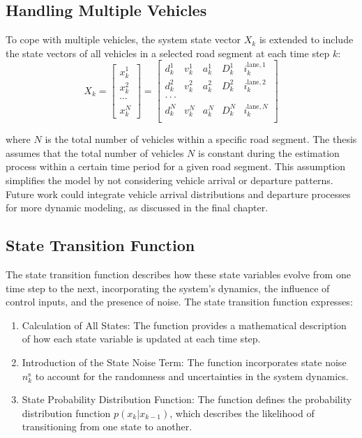 \subsection{Handling Multiple Vehicles}
To cope with multiple vehicles, the system state vector \( X_k \) is extended to include the state vectors of all vehicles in a selected road segment at each time step $k$:
\begin{equation}
    X_k = \begin{bmatrix}
x_k^1 \\
x_k^2 \\
\cdots \\
x_k^N 
\end{bmatrix}
= \begin{bmatrix}
d_k^1 & v_k^1 & a_k^1 & D_{k}^1 & i_k^{\text{lane}, 1}  \\
d_k^2 & v_k^2 & a_k^2 & D_{k}^2 & i_k^{\text{lane}, 2}  \\
\text{$\cdot \cdot \cdot $} \\
d_k^N & v_k^N & a_k^N & D_{k}^N & i_k^{\text{lane}, N}  \\
\end{bmatrix}
\end{equation}

where \( N \) is the total number of vehicles within a specific road segment. The thesis assumes that the total number of vehicles \( N \) is constant during the estimation process within a certain time period for a given road segment. This assumption simplifies the model by not considering vehicle arrival or departure patterns. Future work could integrate vehicle arrival distributions and departure processes for more dynamic modeling, as discussed in the final chapter.





\subsection{State Transition Function}
The state transition function describes how these state variables evolve from one time step to the next, incorporating the system's dynamics, the influence of control inputs, and the presence of noise. The state transition function expresses:

\begin{enumerate}
    \item Calculation of All States: The function provides a mathematical description of how each state variable is updated at each time step.
    \item Introduction of the State Noise Term: The function incorporates state noise \(n_k^\text{s}\) to account for the randomness and uncertainties in the system dynamics.
    \item State Probability Distribution Function: The function defines the probability distribution function \(p(x_k | x_{k-1})\), which describes the likelihood of transitioning from one state to another.
\end{enumerate}

